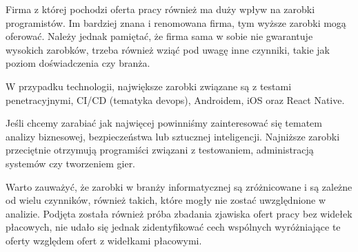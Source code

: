 \documentclass{article}
\begin{document}
\smallskip

Firma z której pochodzi oferta pracy również ma duży wpływ na zarobki programistów. Im bardziej znana i renomowana firma,
tym wyższe zarobki mogą oferować.
Należy jednak pamiętać, że firma sama w sobie nie gwarantuje wysokich zarobków,
trzeba również wziąć pod uwagę inne czynniki, takie jak poziom doświadczenia czy branża.

\smallskip

W przypadku technologii, największe zarobki związane są z testami penetracyjnymi, CI/CD (tematyka devops), Androidem, iOS oraz React Native.

\smallskip

Jeśli chcemy zarabiać jak najwięcej powinniśmy zainteresować się tematem analizy biznesowej, bezpieczeństwa lub sztucznej inteligencji.
Najniższe zarobki przeciętnie otrzymują programiści związani z testowaniem, administracją systemów czy tworzeniem gier.

\bigskip

Warto zauważyć, że zarobki w branży informatycznej są zróżnicowane i są zależne od wielu czynników, również takich,
które mogły nie zostać uwzględnione w analizie.
Podjęta została również próba zbadania zjawiska ofert pracy bez widełek płacowych, nie udało się jednak
zidentyfikować cech wspólnych wyróżniające te oferty względem ofert z widełkami płacowymi.
\end{document}
